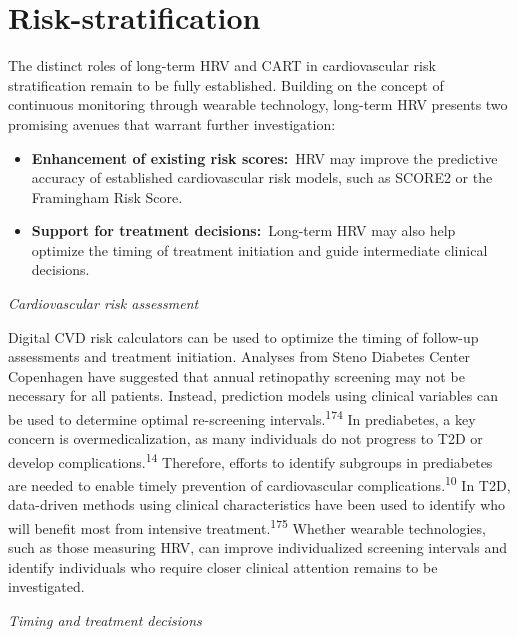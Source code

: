 \documentclass[
  a4paper,
  headsepline=true,
  open=left]{scrbook}
\begin{document}
\hypertarget{risk-stratification-1}{%
\section{Risk-stratification}\label{risk-stratification-1}}

The distinct roles of long-term HRV and CART in cardiovascular risk
stratification remain to be fully established. Building on the concept
of continuous monitoring through wearable technology, long-term HRV
presents two promising avenues that warrant further investigation:

\begin{itemize}
\item
  \textbf{Enhancement of existing risk scores:}~HRV may improve the
  predictive accuracy of established cardiovascular risk models, such as
  SCORE2 or the Framingham Risk Score.
\item
  \textbf{Support for treatment decisions:}~Long-term HRV may also help
  optimize the timing of treatment initiation and guide intermediate
  clinical decisions.
\end{itemize}

\emph{Cardiovascular risk assessment}

Digital CVD risk calculators can be used to optimize the timing of
follow-up assessments and treatment initiation. Analyses from Steno
Diabetes Center Copenhagen have suggested that annual retinopathy
screening may not be necessary for all patients. Instead, prediction
models using clinical variables can be used to determine optimal
re-screening intervals.\textsuperscript{174} In prediabetes, a key
concern is overmedicalization, as many individuals do not progress to
T2D or develop complications.\textsuperscript{14} Therefore, efforts to
identify subgroups in prediabetes are needed to enable timely prevention
of cardiovascular complications.\textsuperscript{10} In T2D, data-driven
methods using clinical characteristics have been used to identify who
will benefit most from intensive treatment.\textsuperscript{175} Whether
wearable technologies, such as those measuring HRV, can improve
individualized screening intervals and identify individuals who require
closer clinical attention remains to be investigated.

\emph{Timing and treatment decisions}
\end{document}
